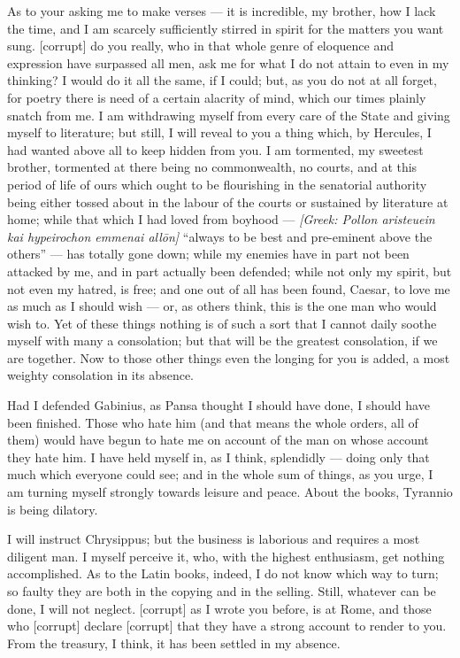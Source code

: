  As to your asking me to make verses --- it is incredible, my brother, how I lack the time, and I am scarcely sufficiently stirred in spirit for the matters you want sung. [corrupt] do you really, who in that whole genre of eloquence and expression have surpassed all men, ask me for what I do not attain to even in my thinking? I would do it all the same, if I could; but, as you do not at all forget, for poetry there is need of a certain alacrity of mind, which our times plainly snatch from me. I am withdrawing myself from every care of the State and giving myself to literature; but still, I will reveal to you a thing which, by Hercules, I had wanted above all to keep hidden from you. I am tormented, my sweetest brother, tormented at there being no commonwealth, no courts, and at this period of life of ours which ought to be flourishing in the senatorial authority being either tossed about in the labour of the courts or sustained by literature at home; while that which I had loved from boyhood --- \textit{[Greek: Pollon aristeuein kai hypeirochon emmenai all\=on]} ``always to be best and pre-eminent above the others'' --- has totally gone down; while my enemies have in part not been attacked by me, and in part actually been defended; while not only my spirit, but not even my hatred, is free; and one out of all has been found, Caesar, to love me as much as I should wish --- or, as others think, this is the one man who would wish to. Yet of these things nothing is of such a sort that I cannot daily soothe myself with many a consolation; but that will be the greatest consolation, if we are together. Now to those other things even the longing for you is added, a most weighty consolation in its absence.

 Had I defended Gabinius, as Pansa thought I should have done, I should have been finished. Those who hate him (and that means the whole orders, all of them) would have begun to hate me on account of the man on whose account they hate him. I have held myself in, as I think, splendidly --- doing only that much which everyone could see; and in the whole sum of things, as you urge, I am turning myself strongly towards leisure and peace. About the books, Tyrannio is being dilatory.

 I will instruct Chrysippus; but the business is laborious and requires a most diligent man. I myself perceive it, who, with the highest enthusiasm, get nothing accomplished. As to the Latin books, indeed, I do not know which way to turn; so faulty they are both in the copying and in the selling. Still, whatever can be done, I will not neglect. [corrupt] as I wrote you before, is at Rome, and those who [corrupt] declare [corrupt] that they have a strong account to render to you. From the treasury, I think, it has been settled in my absence.

